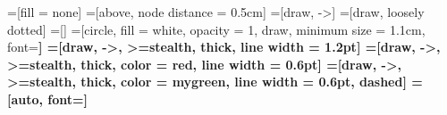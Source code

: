 \usetikzlibrary{positioning}
=[fill = none]
=[above, node distance = 0.5cm]
=[draw, ->]
=[draw, loosely dotted]
=[]
=[circle, fill = white, opacity = 1, draw, minimum size = 1.1cm, font=\bfseries]
=[draw, ->, >=stealth, thick, line width = 1.2pt]
=[draw, ->, >=stealth, thick, color = red, line width = 0.6pt]
=[draw, ->, >=stealth, thick, color = mygreen, line width = 0.6pt, dashed]
=[auto, font=\small]